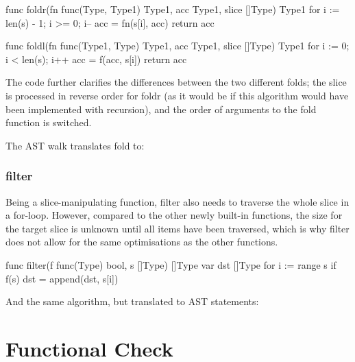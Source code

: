 \begin{code}
    \begin{gocode}
func foldr(fn func(Type, Type1) Type1, acc Type1, slice []Type) Type1 {
    for i := len(s) - 1; i >= 0; i-- {
        acc = fn(s[i], acc)
    }
    return acc
}

func foldl(fn func(Type1, Type) Type1, acc Type1, slice []Type) Type1 {
    for i := 0; i < len(s); i++ {
        acc = f(acc, s[i])
    }
    return acc
}
\end{gocode}
\end{code}

The code further clarifies the differences between the two different folds;
the slice is processed in reverse order for foldr (as it would be if this
algorithm would have been implemented with recursion), and the order of
arguments to the fold function is switched.

The AST walk translates fold to:
\begin{code}
\end{code}

\subsubsection{filter}

Being a slice-manipulating function, filter also needs to traverse the whole
slice in a for-loop. However, compared to the other newly built-in functions,
the size for the target slice is unknown until all items have been traversed,
which is why filter does not allow for the same optimisations as the other
functions.

\begin{code}
    \begin{gocode}
func filter(f func(Type) bool, s []Type) []Type {
    var dst []Type
    for i := range s {
            if f(s) {
                dst = append(dst, s[i])
            }
    }
}
    \end{gocode}
\end{code}

And the same algorithm, but translated to AST statements:

\begin{code}
\end{code}

\section{Functional Check}
